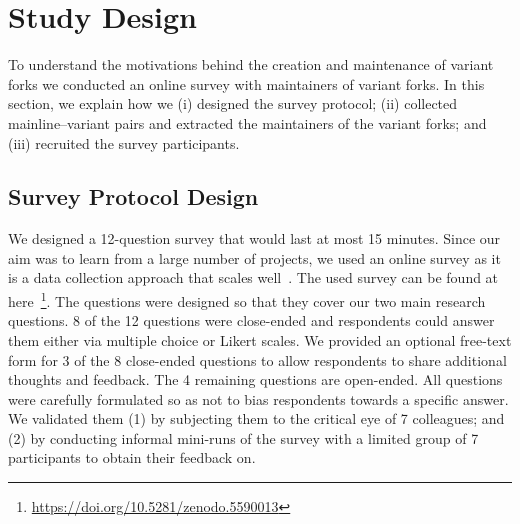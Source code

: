 \section{Study Design}
\label{sec:study_design}

To understand the motivations behind the creation and maintenance of variant forks we conducted an online survey with maintainers of variant forks. In this section, we explain how we (i) designed the survey protocol; (ii) collected mainline--variant pairs and extracted the maintainers of the variant forks; and (iii) recruited the survey participants.


\subsection{Survey Protocol Design}
\label{sec:protocal}

We designed a 12-question survey that would last at most 15 minutes.
Since our aim was to learn from a large number of projects, we used an online survey as it is a data collection approach that scales well~\cite{Flick:2014}.
The used survey can be found at here~\footnote{\url{https://doi.org/10.5281/zenodo.5590013}}.
The questions were designed so that they cover our two main research questions.
8 of the 12 questions were close-ended and respondents could answer them either via multiple choice or Likert scales.
We provided an optional free-text form for 3 of the 8 close-ended questions to allow respondents to share additional thoughts and feedback.
The 4 remaining questions are open-ended.
All questions were carefully formulated so as not to bias respondents towards a specific answer. We validated them (1) by subjecting them to the critical eye of 7 colleagues; and (2) by conducting informal mini-runs of the survey with a limited group of 7 participants to obtain their feedback on.%

